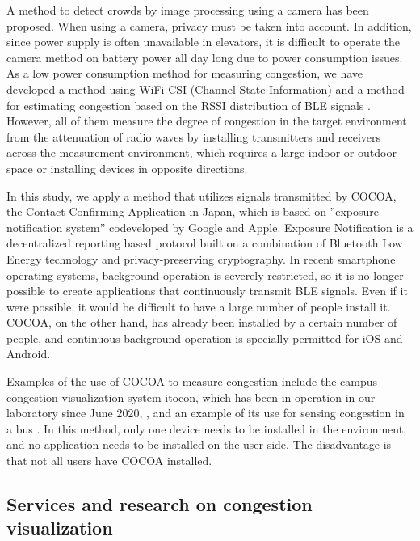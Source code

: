 A method to detect crowds by image processing using a camera has been proposed\cite{research_camera}. When using a camera, privacy must be taken into account. In addition, since power supply is often unavailable in elevators, it is difficult to operate the camera method on battery power all day long due to power consumption issues.
As a low power consumption method for measuring congestion, we have developed a method using WiFi CSI (Channel State Information) \cite{ipsj-taikai-2020-matsumoto} and a method for estimating congestion based on the RSSI distribution of BLE signals \cite{misc/26987957}\cite{umeki2018real}. However, all of them measure the degree of congestion in the target environment from the attenuation of radio waves by installing transmitters and receivers across the measurement environment, which requires a large indoor or outdoor space or installing devices in opposite directions. 

In this study, we apply a method that utilizes signals transmitted by COCOA, the Contact-Confirming Application in Japan, which is based on ''exposure notification system'' codeveloped by Google and Apple. Exposure Notification is a decentralized reporting based protocol built on a combination of Bluetooth Low Energy technology and privacy-preserving cryptography. In recent smartphone operating systems, background operation is severely restricted, so it is no longer possible to create applications that continuously transmit BLE signals. Even if it were possible, it would be difficult to have a large number of people install it. COCOA, on the other hand, has already been installed by a certain number of people, and continuous background operation is specially permitted for iOS and Android.

Examples of the use of COCOA to measure congestion include the campus congestion visualization system itocon, which has been in operation in our laboratory since June 2020, \cite{research_itocon}, and an example of its use for sensing congestion in a bus \cite{kanamitu-2021-dicomo}. In this method, only one device needs to be installed in the environment, and no application needs to be installed on the user side. The disadvantage is that not all users have COCOA installed.


\subsection{Services and research on congestion visualization}

